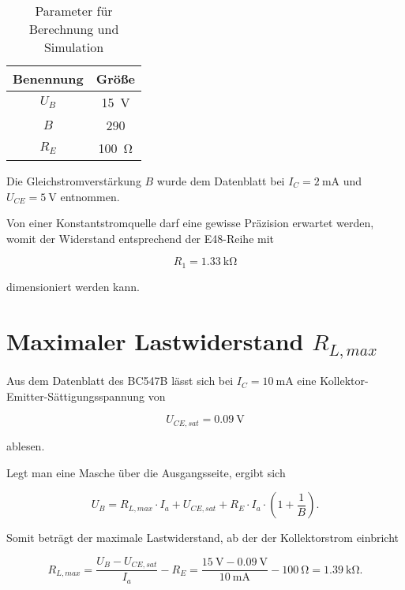 \begin{table}[H]
\centering
\begin{tabular}{|c|c|} \hline
Benennung & Größe \\ \hline
$U_B$ & \SI{15}{\volt} \\ \hline
$B$ & 290 \\ \hline
$R_E$ & \SI{100}{\ohm} \\ \hline
\end{tabular}
\caption{Parameter für Berechnung und Simulation}
\label{tab_Kap4_01:Bauteilwerte} 
\end{table}

Die Gleichstromverstärkung $B$ wurde dem Datenblatt bei $I_C = \SI{2}{\milli\ampere}$ und $U_{CE} = \SI{5}{\volt}$ entnommen.

Von einer Konstantstromquelle darf eine gewisse Präzision erwartet werden, womit der Widerstand entsprechend der E48-Reihe mit

\begin{equation*}
    R_1 = \SI{1.33}{\kilo\ohm}
\end{equation*}

dimensioniert werden kann.

\section{Maximaler Lastwiderstand $R_{L,max}$}
Aus dem Datenblatt des BC547B lässt sich bei $I_C = \SI{10}{\milli\ampere}$ eine Kollektor-Emitter-Sättigungsspannung von 

\begin{equation}
    U_{CE,sat} = \SI{0.09}{\volt}
\end{equation}

ablesen.

Legt man eine Masche über die Ausgangsseite, ergibt sich

\begin{equation}
    U_B = R_{L,max} \cdot I_a + U_{CE,sat} + R_E \cdot I_a \cdot \left(1 + \frac{1}{B} \right) .
\end{equation}

Somit beträgt der maximale Lastwiderstand, ab der der Kollektorstrom einbricht

\begin{equation}
    R_{L,max} = \frac{U_B - U_{CE,sat}}{I_a} - R_E = \frac{\SI{15}{\volt} - \SI{0.09}{\volt}}{\SI{10}{\milli\ampere}} - \SI{100}{\ohm} = \SI{1.39}{\kilo\ohm} .
\end{equation}

